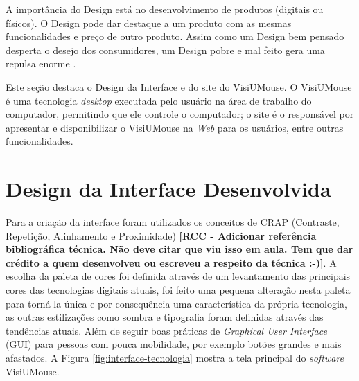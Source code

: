 A importância do Design está no desenvolvimento de produtos (digitais ou físicos). O Design pode dar destaque a um produto com as mesmas funcionalidades e preço de outro produto. Assim como um Design bem pensado desperta o desejo dos consumidores, um Design pobre e mal feito gera uma repulsa enorme \cite{patterson2017computer}.

Este seção destaca o Design da Interface e do site do VisiUMouse. O VisiUMouse é uma tecnologia \textit{desktop} executada pelo usuário na área de trabalho do computador, permitindo que ele controle o computador; o site é o responsável por apresentar e disponibilizar o VisiUMouse na \textit{Web} para os usuários, entre outras funcionalidades.

\section{Design da Interface Desenvolvida}\label{Sub:software}
Para a criação da interface foram utilizados os conceitos de CRAP (Contraste, Repetição, Alinhamento e Proximidade) \textbf{[RCC - Adicionar referência bibliográfica técnica. Não deve citar que viu isso em aula. Tem que dar crédito a quem desenvolveu ou escreveu a respeito da técnica :-)]}. %
A escolha da paleta de cores foi definida através de um levantamento das principais cores das tecnologias digitais atuais, foi feito uma pequena alteração nesta paleta para torná-la única e por consequência uma característica da própria tecnologia, as outras estilizações como sombra e tipografia foram definidas através das tendências atuais. Além de seguir boas práticas de \textit{Graphical User Interface} (GUI) para pessoas com pouca mobilidade, por exemplo botões grandes e mais afastados. A Figura \ref{fig:interface-tecnologia} mostra a tela principal do \textit{software} VisiUMouse.

